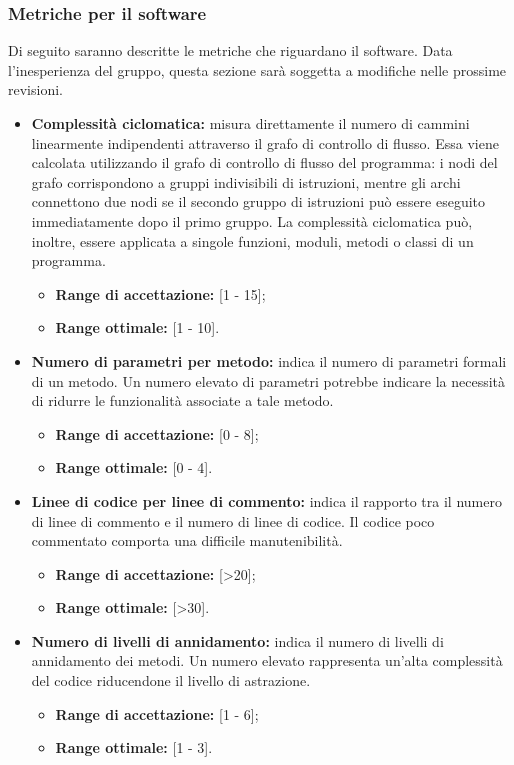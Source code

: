 	\subsubsection{Metriche per il software}
	Di seguito saranno descritte le metriche che riguardano il software. Data l'inesperienza del gruppo, questa sezione sarà soggetta a modifiche nelle prossime revisioni.
	\begin{itemize}
		\item \textbf{Complessità ciclomatica:} misura direttamente il numero di cammini linearmente indipendenti attraverso il grafo di controllo di flusso. Essa viene calcolata utilizzando il grafo di controllo di flusso del programma: i nodi del grafo corrispondono a gruppi indivisibili di istruzioni, mentre gli archi connettono due nodi se il secondo gruppo di istruzioni può essere eseguito immediatamente dopo il primo gruppo. La complessità ciclomatica può, inoltre, essere applicata a singole funzioni, moduli, metodi o classi di un programma.
			\begin{itemize}
				\item \textbf{Range di accettazione:} [1 - 15];
				\item \textbf{Range ottimale:} [1 - 10].
			\end{itemize}
		\item \textbf{Numero di parametri per metodo:} indica il numero di parametri formali di un metodo. Un numero elevato di parametri potrebbe indicare la necessità di ridurre le funzionalità associate a tale metodo.
			\begin{itemize}
				\item \textbf{Range di accettazione:} [0 - 8];
				\item \textbf{Range ottimale:} [0 - 4].
			\end{itemize}
		\item \textbf{Linee di codice per linee di commento:} indica il rapporto tra il numero di linee di commento e il numero di linee di codice. Il codice poco commentato comporta una difficile manutenibilità.
			\begin{itemize}
				\item \textbf{Range di accettazione:} [>20];
				\item \textbf{Range ottimale:} [>30].
			\end{itemize}
		\item \textbf{Numero di livelli di annidamento:} indica il numero di livelli di annidamento dei metodi. Un numero elevato rappresenta un'alta complessità del codice riducendone il livello di astrazione.
			\begin{itemize}
				\item \textbf{Range di accettazione:} [1 - 6];
				\item \textbf{Range ottimale:} [1 - 3].
			\end{itemize}
	\end{itemize}